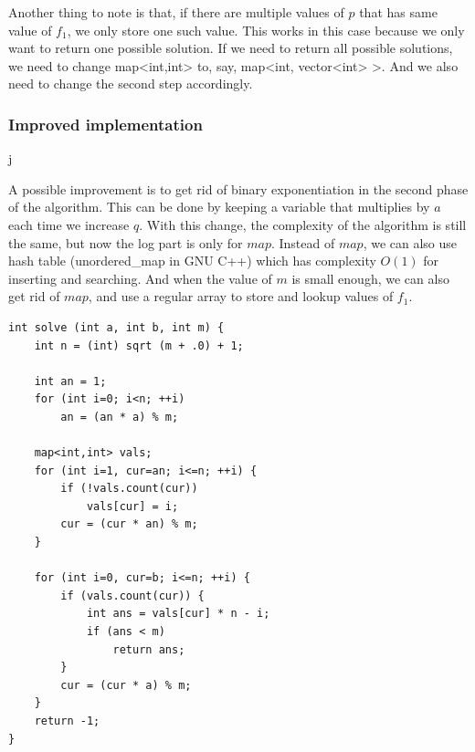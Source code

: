 \documentclass[8pt, a4paper, oneside, twocolumn]{extarticle}
\begin{document}
Another thing to note is that, if there are multiple values of $p$ that has same value of $f_1$, we only store one such value. This works in this case because we only want to return one possible solution. If we need to return all possible solutions, we need to change map<int,int> to, say, map<int, vector<int> >. And we also need to change the second step accordingly.
\subsubsection{Improved implementation}j

A possible improvement is to get rid of binary exponentiation in the second phase of the algorithm. This can be done by keeping a variable that multiplies by $a$ each time we increase $q$. With this change, the complexity of the algorithm is still the same, but now the log part is only for $map$. Instead of $map$, we can also use hash table (unordered\_{}map in GNU C++) which has complexity $O(1)$ for inserting and searching. And when the value of $m$ is small enough, we can also get rid of $map$, and use a regular array to store and lookup values of $f_1$.
\begin{verbatim}
int solve (int a, int b, int m) {
	int n = (int) sqrt (m + .0) + 1;
 
	int an = 1;
	for (int i=0; i<n; ++i)
		an = (an * a) % m;
 
	map<int,int> vals;
	for (int i=1, cur=an; i<=n; ++i) {
		if (!vals.count(cur))
			vals[cur] = i;
		cur = (cur * an) % m;
	}
 
	for (int i=0, cur=b; i<=n; ++i) {
		if (vals.count(cur)) {
			int ans = vals[cur] * n - i;
			if (ans < m)
				return ans;
		}
		cur = (cur * a) % m;
	}
	return -1;
}
\end{verbatim}
\end{document}

